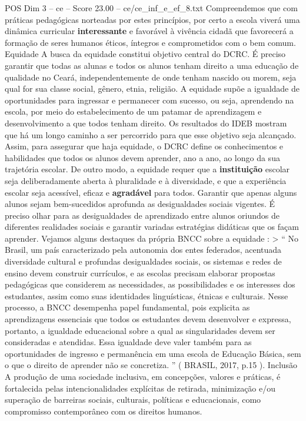 \begin{textsample}{POS Dim 3 – ce – Score 23.00 – ce/ce\_inf\_e\_ef\_8.txt}
Compreendemos que com práticas pedagógicas norteadas por estes princípios, por certo a escola viverá uma dinâmica curricular \textbf{interessante} e favorável à vivência cidadã que favorecerá a formação de seres humanos éticos, íntegros e comprometidos com o bem comum.
Equidade A busca da equidade constitui objetivo central do DCRC.
É preciso garantir que todas as alunas e todos os alunos tenham direito a uma educação de qualidade no Ceará, independentemente de onde tenham nascido ou morem, seja qual for sua classe social, gênero, etnia, religião.
A equidade supõe a igualdade de oportunidades para ingressar e permanecer com sucesso, ou seja, aprendendo na escola, por meio do estabelecimento de um patamar de aprendizagem e desenvolvimento a que todos tenham direito.
Os resultados do IDEB mostram que há um longo caminho a ser percorrido para que esse objetivo seja alcançado.
Assim, para assegurar que haja equidade, o DCRC define os conhecimentos e habilidades que todos os alunos devem aprender, ano a ano, ao longo da sua trajetória escolar.
De outro modo, a equidade requer que a \textbf{instituição} escolar seja deliberadamente aberta à pluralidade e à diversidade, e que a experiência escolar seja acessível, eficaz e \textbf{agradável} para todos.
Garantir que apenas alguns alunos sejam bem-sucedidos aprofunda as desigualdades sociais vigentes.
É preciso olhar para as desigualdades de aprendizado entre alunos oriundos de diferentes realidades sociais e garantir variadas estratégias didáticas que os façam aprender.
Vejamos alguns destaques da própria BNCC sobre a equidade : > “ No Brasil, um país caracterizado pela autonomia dos entes federados, acentuada diversidade cultural e profundas desigualdades sociais, os sistemas e redes de ensino devem construir currículos, e as escolas precisam elaborar propostas pedagógicas que considerem as necessidades, as possibilidades e os interesses dos estudantes, assim como suas identidades linguísticas, étnicas e culturais.
Nesse processo, a BNCC desempenha papel fundamental, pois explicita as aprendizagens essenciais que todos os estudantes devem desenvolver e expressa, portanto, a igualdade educacional sobre a qual as singularidades devem ser consideradas e atendidas.
Essa igualdade deve valer também para as oportunidades de ingresso e permanência em uma escola de Educação Básica, sem o que o direito de aprender não se concretiza. ” ( BRASIL, 2017, p.15 ).
Inclusão A produção de uma sociedade inclusiva, em concepções, valores e práticas, é fortalecida pelas intencionalidades explícitas de retirada, minimização e/ou superação de barreiras sociais, culturais, políticas e educacionais, como compromisso contemporâneo com os direitos humanos.

\end{textsample}
